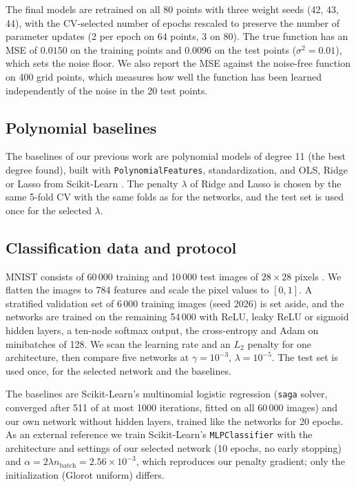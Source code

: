 \documentclass[amssymb,twocolumn,aps]{revtex4}
\begin{document}
The final models are retrained on all 80 points with three weight seeds (42, 43, 44), with the CV-selected number of epochs rescaled to preserve the number of parameter updates (2 per epoch on 64 points, 3 on 80). The true function has an MSE of $0.0150$ on the training points and $0.0096$ on the test points ($\sigma^2=0.01$), which sets the noise floor. We also report the MSE against the noise-free function on 400 grid points, which measures how well the function has been learned independently of the noise in the 20 test points.


\subsection{Polynomial baselines}
The baselines of our previous work \cite{project1} are polynomial models of degree 11 (the best degree found), built with \texttt{PolynomialFeatures}, standardization, and OLS, Ridge or Lasso from Scikit-Learn \cite{pedregosa2011}. The penalty $\lambda$ of Ridge and Lasso is chosen by the same 5-fold CV with the same folds as for the networks, and the test set is used once for the selected $\lambda$. 

\subsection{Classification data and protocol}
MNIST consists of 60\,000 training and 10\,000 test images of $28\times 28$ pixels \cite{lecun}. We flatten the images to 784 features and scale the pixel values to $[0,1]$. A stratified validation set of 6\,000 training images (seed 2026) is set aside, and the networks are trained on the remaining 54\,000 with ReLU, leaky ReLU or sigmoid hidden layers, a ten-node softmax output, the cross-entropy and Adam on minibatches of 128. We scan the learning rate and an $L_2$ penalty for one architecture, then compare five networks at $\gamma=10^{-3}$, $\lambda=10^{-5}$. The test set is used once, for the selected network and the baselines.

The baselines are Scikit-Learn's multinomial logistic regression (\texttt{saga} solver, converged after 511 of at most 1000 iterations, fitted on all 60\,000 images) and our own network without hidden layers, trained like the networks for 20 epochs. As an external reference we train Scikit-Learn's \texttt{MLPClassifier} \cite{pedregosa2011} with the architecture and settings of our selected network (10 epochs, no early stopping) and $\alpha=2\lambda n_\mathrm{batch}=2.56\times10^{-3}$, which reproduces our penalty gradient; only the initialization (Glorot uniform) differs.
\end{document}
